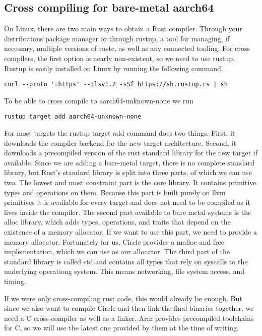 \subsection{Cross compiling for bare-metal aarch64}
\label{sec:concept_and_implementation:bare-metal:cross}

On Linux, there are two main ways to obtain a Rust compiler.
Through your distributions package manager or through rustup,
a tool for managing, if necessary, multiple versions of rustc, as well as any connected tooling.
For cross compilers, the first option is nearly non-existent, so we need to use rustup.
Rustup is easily installed on Linux by running the following command.
\begin{verbatim}
curl --proto '=https' --tlsv1.2 -sSf https://sh.rustup.rs | sh
\end{verbatim}
To be able to cross compile to aarch64-unknown-none we run
\begin{verbatim}
rustup target add aarch64-unknown-none
\end{verbatim}
For most targets the rustup target add command does two things.
First, it downloads the compiler backend for the new target architecture.
Second, it downloads a precompiled version of the rust standard library for the new target if available.
Since we are adding a bare-metal target, there is no complete standard library, but Rust's standard library is split into three parts, of which we can use two.
The lowest and most constraint part is the core library.
It contains primitive types and operations on them.
Because this part is built purely on llvm primitives it is available for every target and does not need to be compiled as it lives inside the compiler.
The second part available to bare metal systems is the alloc library, which adds types, operations, and traits that depend on the existence of a memory allocator.
If we want to use this part, we need to provide a memory allocator.
Fortunately for us, Circle provides a malloc and free implementation, which we can use as our allocator.
The third part of the standard library is called std and contains all types that rely on syscalls to the underlying operationg system.
This means networking, file system access, and timing.

If we were only cross-compiling rust code, this would already be enough.
But since we also want to compile Circle and then link the final binaries together, we need a C cross-compiler as well as a linker.
Arm provides precompiled toolchains for C, so we will use the latest one provided by them at the time of writing.

